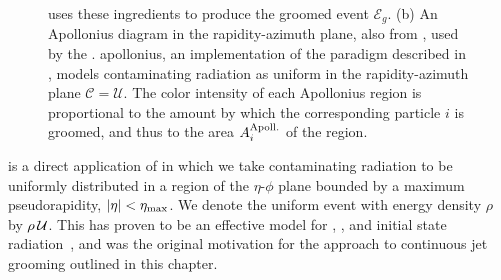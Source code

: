 \begin{figure}[t!]
{    %
     uses these ingredients to produce the groomed event \(\mathcal{E}_g\).
    (b) An Apollonius diagram in the rapidity-azimuth plane, also from , used by the .
    \gls{apollonius}, an implementation of the \PIRANHA{} paradigm described in , models contaminating radiation as uniform in the rapidity-azimuth plane \(\mathcal C = \mathcal U\).
    The color intensity of each Apollonius region is proportional to the amount by which the corresponding particle \(i\) is groomed, and thus to the area \(A^{\rm Apoll.}_i\) of the region.
}
\label{fig:as}
\end{figure}



 is a direct application of  in which we take contaminating radiation to be uniformly distributed in a region of the \(\eta\)-\(\phi\) plane bounded by a maximum pseudorapidity, \(|\eta| < \eta_{\rm max}\).
%
We denote the uniform event with energy density \(\rho\) by \(\rho\,\mathcal{U}\).
%
This has proven to be an effective model for , , and initial state radiation~\cite{Soyez:2018opl,Monk:2018clo,Sjostrand:1987su,Sjostrand:2014zea,Dasgupta:2007wa,Kirchgaesser:2020poq,Moraes:2007rq,CDF:2015txs,Larkoski:2021hee,Baron:2020xoi,Marzani:2017kqd}, and was the original motivation for the \PIRANHA{} approach to continuous jet grooming outlined in this chapter.

